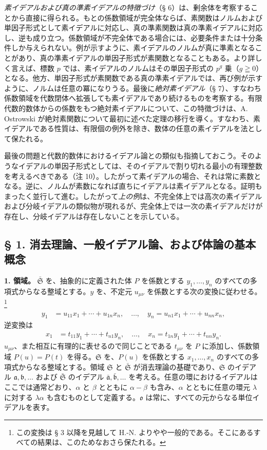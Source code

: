 \documentclass[11pt]{article}
\providecommand{\frakS}{\mathfrak S}
\providecommand{\fraka}{\mathfrak a}
\providecommand{\frakb}{\mathfrak b}
\providecommand{\frako}{\mathfrak o}
\providecommand{\frako}{\mathfrak o}
\begin{document}
\emph{素イデアルおよび真の準素イデアルの特徴づけ}（§ 6）は、剰余体を考察することから直接に得られる。もとの係数領域が完全体ならば、素関数はノルムおよび単因子形式として素イデアルに対応し、真の準素関数は真の準素イデアルに対応し、逆も成り立つ。係数領域が不完全体である場合には、必要条件または十分条件しか与えられない。例が示すように、素イデアルのノルムが真に準素となることがあり、真の準素イデアルの単因子形式が素関数となることもある。より詳しく言えば、標数 $p$ では、素イデアルの\mbox{ノルム}はその単因子形式の $p^g$ 乗（$g\geqq0$）となる。他方、単因子形式が素関数である真の準素イデアルでは、\mbox{再び}例が示すように、ノルムは任意の冪になりうる。最後に\emph{絶対素イデアル}（§ 7）、すなわち係数領域を代数閉体へ拡張しても素イデアルであり続けるものを考察する。有限代数的数体からの係数をもつ絶対素イデアルについて、この特徴づけは、A. Ostrowski が絶対素関数について最初に述べた定理の移行を導く。すなわち、素イデアルである性質は、有限個の例外を除き、数体の任意の素イデアルを法として保たれる。

最後の問題と代数的数体におけるイデアル論との類似も指摘しておこう。そのようなイデアルの単因子形式としては、そのイデアルで割り切れる最小の有理整数を考えるべきである（注 10）。したがって素イデアルの場合、それは常に素数となる。逆に、ノルムが素数になれば直ちにイデアルは素イデアルとなる。証明もまったく並行して進む。したがって\emph{上の例}は、不完全体上では高次の素イデアルおよび分岐イデアルの類似物が現れるが、完全体上では一次の素イデアルだけが存在し、分岐イデアルは存在しないことを示している。

\subsection*{§ 1. 消去理論、一般イデアル論、および体論の基本概念}

\textbf{1. 領域。} $\bar{\frakS}$ を、抽象的に定義された体 $P$ を係数とする $y_1,\ldots,y_n$ のすべての多項式からなる整域とする。$y$ を、不定元 $u_{\mu\nu}$ を係数とする次の変換に従わせる。\footnote{この変換は § 3 以降を見越して H.-N. よりやや一般的である。そこにあるすべての結果は、このためなおさら保たれる。}
\begin{align}
 y_1&=u_{11}x_1+\cdots+u_{1n}x_n,\quad \ldots,\quad
 y_n=u_{n1}x_1+\cdots+u_{nn}x_n, \tag{1}
\end{align}
逆変換は
\begin{align}
 x_1&=t_{11}y_1+\cdots+t_{n1}y_n,\quad \ldots,\quad
 x_n=t_{1n}y_1+\cdots+t_{nn}y_n. \tag{1'}
\end{align}
$u_{\mu\nu}$、また相互に有理的に表せるので同じことである $t_{\mu\nu}$ を $P$ に添加し、係数領域 $P(u)=P(t)$ を得る。$\frakS$ を、$P(u)$ を係数とする $x_1,\ldots,x_n$ のすべての多項式からなる整域とする。領域 $\frakS$ と $\bar{\frakS}$ が消去理論の基礎であり、$\frakS$ のイデアル $\fraka,\frakb,\ldots$ および $\bar{\frakS}$ のイデアル $\bar{\fraka},\bar{\frakb},\ldots$ を考える。任意の環におけるイデアルはここでは通常どおり、$\alpha$ と $\beta$ とともに $\alpha-\beta$ も含み、$\alpha$ とともに任意の環元 $\lambda$ に対する $\lambda\alpha$ も含むものとして定義する。$\frako$ は常に、すべての元からなる単位イデアルを表す。
\end{document}
